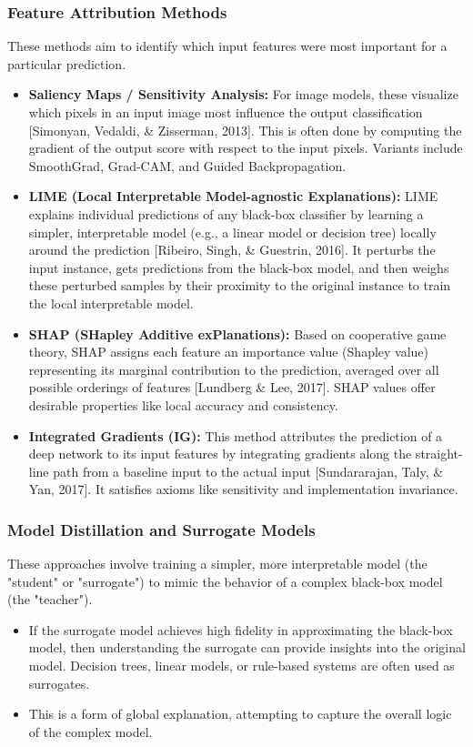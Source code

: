 \documentclass[11pt,a4paper]{article}
\begin{document}
\subsubsection{Feature Attribution Methods}
These methods aim to identify which input features were most important for a particular prediction.
\begin{itemize}
    \item \textbf{Saliency Maps / Sensitivity Analysis:} For image models, these visualize which pixels in an input image most influence the output classification [Simonyan, Vedaldi, \& Zisserman, 2013]. This is often done by computing the gradient of the output score with respect to the input pixels. Variants include SmoothGrad, Grad-CAM, and Guided Backpropagation.
    \item \textbf{LIME (Local Interpretable Model-agnostic Explanations):} LIME explains individual predictions of any black-box classifier by learning a simpler, interpretable model (e.g., a linear model or decision tree) locally around the prediction [Ribeiro, Singh, \& Guestrin, 2016]. It perturbs the input instance, gets predictions from the black-box model, and then weighs these perturbed samples by their proximity to the original instance to train the local interpretable model.
    \item \textbf{SHAP (SHapley Additive exPlanations):} Based on cooperative game theory, SHAP assigns each feature an importance value (Shapley value) representing its marginal contribution to the prediction, averaged over all possible orderings of features [Lundberg \& Lee, 2017]. SHAP values offer desirable properties like local accuracy and consistency.
    \item \textbf{Integrated Gradients (IG):} This method attributes the prediction of a deep network to its input features by integrating gradients along the straight-line path from a baseline input to the actual input [Sundararajan, Taly, \& Yan, 2017]. It satisfies axioms like sensitivity and implementation invariance.
\end{itemize}

\subsubsection{Model Distillation and Surrogate Models}
These approaches involve training a simpler, more interpretable model (the "student" or "surrogate") to mimic the behavior of a complex black-box model (the "teacher").
\begin{itemize}
    \item If the surrogate model achieves high fidelity in approximating the black-box model, then understanding the surrogate can provide insights into the original model. Decision trees, linear models, or rule-based systems are often used as surrogates.
    \item This is a form of global explanation, attempting to capture the overall logic of the complex model.
\end{itemize}
\end{document}

